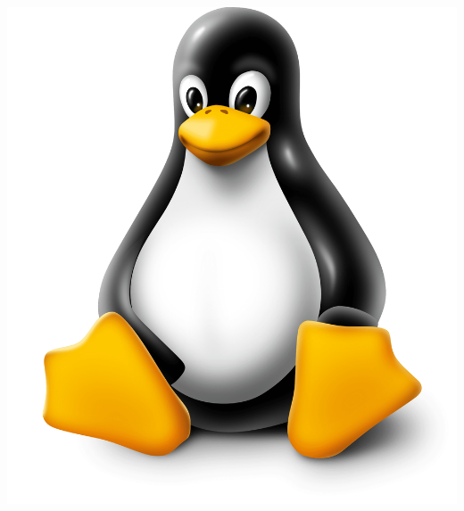 \documentclass[a4paper, 11pt, oneside]{article}
\begin{document}
\begin{itemize}
\begin{center}
        \includegraphics[scale=0.10]{Linux.png}
    \end{center}
\end{itemize}
\end{document}
